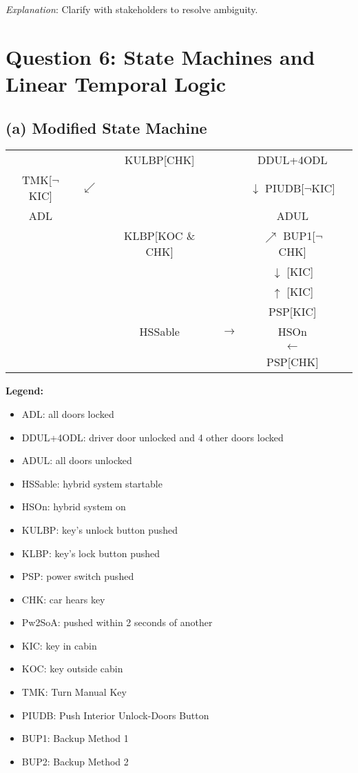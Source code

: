 \documentclass{article}
\begin{document}
\textit{Explanation}: Clarify with stakeholders to resolve ambiguity.

\section*{Question 6: State Machines and Linear Temporal Logic}

\subsection*{(a) Modified State Machine}
\begin{center}
\begin{tabular}{c c c c c c}
& & KULBP[CHK] & & DDUL+4ODL & \\
TMK[$\neg$KIC] & $\swarrow$ & & & $\downarrow$ PIUDB[$\neg$KIC] \\
ADL & & & & ADUL & \\
& & KLBP[KOC \& CHK] & & $\nearrow$ BUP1[$\neg$CHK] \\
& & & & $\downarrow$ [KIC] \\
& & & & $\uparrow$ [KIC] \\
& & & & PSP[KIC] \\
& & HSSable & $\rightarrow$ & HSOn & \\
& & & & $\leftarrow$ & \\
& & & & PSP[CHK] &
\end{tabular}
\end{center}
\textbf{Legend:}
\begin{itemize}
    \item ADL: all doors locked
    \item DDUL+4ODL: driver door unlocked and 4 other doors locked
    \item ADUL: all doors unlocked
    \item HSSable: hybrid system startable
    \item HSOn: hybrid system on
    \item KULBP: key's unlock button pushed
    \item KLBP: key's lock button pushed
    \item PSP: power switch pushed
    \item CHK: car hears key
    \item Pw2SoA: pushed within 2 seconds of another
    \item KIC: key in cabin
    \item KOC: key outside cabin
    \item TMK: Turn Manual Key
    \item PIUDB: Push Interior Unlock-Doors Button
    \item BUP1: Backup Method 1
    \item BUP2: Backup Method 2
\end{itemize}
\end{document}
